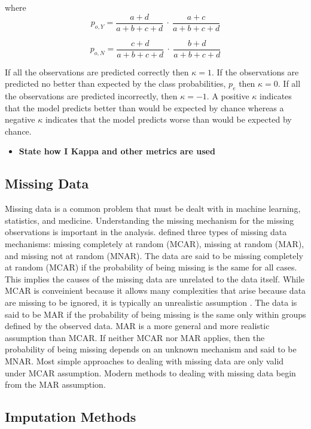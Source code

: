 \documentclass[12pt,]{article}
\providecommand{\tightlist}{%
  \setlength{\itemsep}{0pt}\setlength{\parskip}{0pt}}
\begin{document}
where \[
p_{o,Y} = \frac{a+d}{a+b+c+d} ~\cdot~ \frac{a+c}{a+b+c+d}
\]

\[
p_{o,N} = \frac{c+d}{a+b+c+d} ~\cdot~ \frac{b+d}{a+b+c+d}
\]

If all the observations are predicted correctly then \(\kappa=1\). If
the observations are predicted no better than expected by the class
probabilities, \(p_e\) then \(\kappa=0\). If all the observations are
predicted incorrectly, then \(\kappa=-1\). A positive \(\kappa\)
indicates that the model predicts better than would be expected by
chance whereas a negative \(\kappa\) indicates that the model predicts
worse than would be expected by chance.

\begin{itemize}
\tightlist
\item
  \textbf{State how I Kappa and other metrics are used}
\end{itemize}

\subsection{Missing Data}\label{missing-data}

Missing data is a common problem that must be dealt with in machine
learning, statistics, and medicine. Understanding the missing mechanism
for the missing observations is important in the analysis.
\citep{rubin_inference_1976} defined three types of missing data
mechanisms: missing completely at random (MCAR), missing at random
(MAR), and missing not at random (MNAR). The data are said to be missing
completely at random (MCAR) if the probability of being missing is the
same for all cases. This implies the causes of the missing data are
unrelated to the data itself. While MCAR is conveinient because it
allows many complexities that arise because data are missing to be
ignored, it is typically an unrealistic assumption
\citep{van_buuren_flexible_2012}. The data is said to be MAR if the
probability of being missing is the same only within groups defined by
the observed data. MAR is a more general and more realistic assumption
than MCAR. If neither MCAR nor MAR applies, then the probability of
being missing depends on an unknown mechanism and said to be MNAR. Most
simple approaches to dealing with missing data are only valid under MCAR
assumption. Modern methods to dealing with missing data begin from the
MAR assumption.

\subsection{Imputation Methods}\label{imputation-methods}
\end{document}
